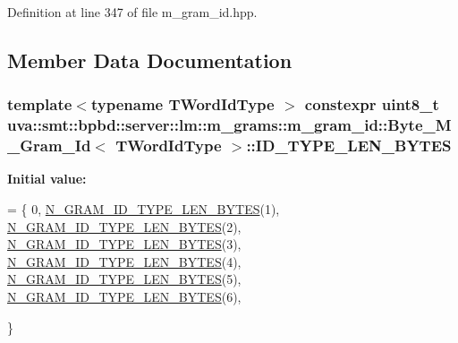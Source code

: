 Definition at line 347 of file m\+\_\+gram\+\_\+id.\+hpp.



\subsection{Member Data Documentation}
\hypertarget{classuva_1_1smt_1_1bpbd_1_1server_1_1lm_1_1m__grams_1_1m__gram__id_1_1_byte___m___gram___id_ae3d32f4b5f983e8f034c494cdd87f065}{}
\subsubsection[{I\+D\+\_\+\+T\+Y\+P\+E\+\_\+\+L\+E\+N\+\_\+\+B\+Y\+T\+E\+S}]{\setlength{\rightskip}{0pt plus 5cm}template$<$typename T\+Word\+Id\+Type $>$ constexpr uint8\+\_\+t {\bf uva\+::smt\+::bpbd\+::server\+::lm\+::m\+\_\+grams\+::m\+\_\+gram\+\_\+id\+::\+Byte\+\_\+\+M\+\_\+\+Gram\+\_\+\+Id}$<$ T\+Word\+Id\+Type $>$\+::I\+D\+\_\+\+T\+Y\+P\+E\+\_\+\+L\+E\+N\+\_\+\+B\+Y\+T\+E\+S\hspace{0.3cm}{\ttfamily [static]}}\label{classuva_1_1smt_1_1bpbd_1_1server_1_1lm_1_1m__grams_1_1m__gram__id_1_1_byte___m___gram___id_ae3d32f4b5f983e8f034c494cdd87f065}
{\bfseries Initial value\+:}
\begin{DoxyCode}
= \{
                                    0,
                                    \hyperlink{m__gram__id_8hpp_ac6b2aaaa1c4c542db69a1f59c2245a86}{N\_GRAM\_ID\_TYPE\_LEN\_BYTES}(1),
                                    \hyperlink{m__gram__id_8hpp_ac6b2aaaa1c4c542db69a1f59c2245a86}{N\_GRAM\_ID\_TYPE\_LEN\_BYTES}(2),
                                    \hyperlink{m__gram__id_8hpp_ac6b2aaaa1c4c542db69a1f59c2245a86}{N\_GRAM\_ID\_TYPE\_LEN\_BYTES}(3),
                                    \hyperlink{m__gram__id_8hpp_ac6b2aaaa1c4c542db69a1f59c2245a86}{N\_GRAM\_ID\_TYPE\_LEN\_BYTES}(4),
                                    \hyperlink{m__gram__id_8hpp_ac6b2aaaa1c4c542db69a1f59c2245a86}{N\_GRAM\_ID\_TYPE\_LEN\_BYTES}(5),
                                    \hyperlink{m__gram__id_8hpp_ac6b2aaaa1c4c542db69a1f59c2245a86}{N\_GRAM\_ID\_TYPE\_LEN\_BYTES}(6),

                                \}
\end{DoxyCode}


